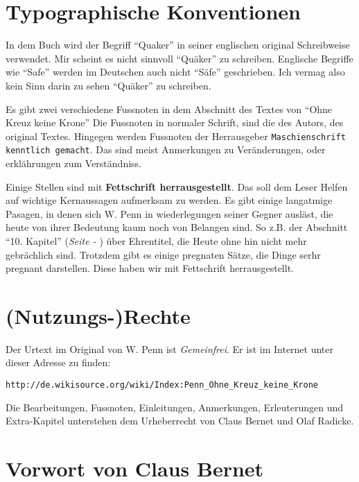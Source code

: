 \chapter{Typographische Konventionen}

In dem Buch wird der Begriff "`Quaker"'  in seiner englischen original Schreibweise verwendet. Mir scheint es nicht sinnvoll "`Quäker"' zu schreiben. Englische Begriffe wie "`Safe"' werden im Deutschen auch nicht "`Säfe"' geschrieben. Ich vermag also kein Sinn darin zu sehen "`Quäker"' zu schreiben.

\medskip

Es gibt zwei verschiedene Fussnoten in dem Abschnitt des Textes von "`Ohne Kreuz keine Krone"' Die Fussnoten in normaler Schrift, sind die des Autors, des original Textes. Hingegen werden Fussnoten der Herrausgeber \texttt{Maschienschrift kenntlich gemacht}. Das sind meist Anmerkungen zu Veränderungen, oder erklährungen zum Verständniss.

\medskip

Einige Stellen sind mit \textbf{Fettschrift herrausgestellt}. Das soll dem Leser Helfen auf wichtige Kernaussagen aufmerksam zu werden. Es gibt einige langatmige Pasagen, in denen sich W. Penn in wiederlegungen seiner Gegner ausläst, die heute von ihrer Bedeutung kaum noch von Belangen sind. So z.B. der Abschnitt "`10. Kapitel"' (\textit{Seite \pageref{kap10} - \pageref{kap10_ende}}) über Ehrentitel, die Heute ohne hin nicht mehr gebrächlich sind. Trotzdem gibt es einige pregnaten Sätze, die Dinge serhr pregnant darstellen. Diese haben wir mit Fettschrift herrausgestellt.

\chapter{(Nutzungs-)Rechte}
Der Urtext im Original von W. Penn ist \textit{Gemeinfrei}. Er ist im Internet unter dieser Adresse zu finden:

\begin{center}
\texttt{http://de.wikisource.org/wiki/Index:Penn\_Ohne\_Kreuz\_keine\_Krone}
\end{center}

Die Bearbeitungen, Fussnoten, Einleitungen, Anmerkungen, Erleuterungen und Extra-Kapitel unterstehen dem Urheberrecht von Claus Bernet und Olaf Radicke.

\chapter{Vorwort von Claus Bernet}


